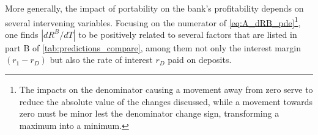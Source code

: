 More generally, the impact of portability on the bank's profitability depends on several intervening variables. Focusing on the numerator of \autoref{eq:A_dRB_pde}\footnote{The impacts on the denominator causing a movement away from zero serve to reduce the absolute value of the changes discussed, while a movement towards zero must be minor lest the denominator change sign, transforming a maximum into a minimum.}, one finds $| dR^B / dT|$  to be positively related to several factors that are listed in part B of \autoref{tab:predictions_compare}, among them not only the interest margin $(r_1-r_D)$  but also the rate of interest $r_D$  paid on deposits.
